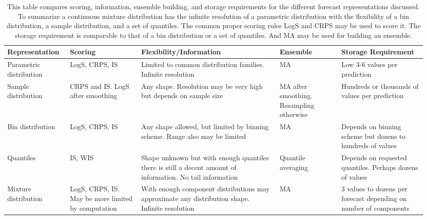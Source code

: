 \documentclass[11pt,notitlepage]{isuthesis}
\begin{document}
\begin{flushleft}

  \begin{table}
   \begin{adjustwidth}{-1cm}{-1cm}
    \begin{tabular}{ | p{2.9cm} || p{3cm} | p{4cm} | p{3cm} | p{3.5cm} |}
    \hline
    \textbf{Representation} & \textbf{Scoring} & 
    \textbf{Flexibility/Information} & \textbf{Ensemble} &
    \textbf{Storage Requirement}
    \\ \hline \hline

    Parametric distribution & LogS, CRPS, IS & Limited to common 
    distribution families. 
    Infinite resolution
    & MA & Low 3-6 values per prediction \\ \hline
    
    Sample distribution & CRPS and IS. LogS after smoothing & Any shape. 
    Resolution may be
    very high but depends on sample size & MA after smoothing. Resampling 
    otherwise & 
    Hundreds or thousands of values per prediction
    \\ \hline
    
    Bin distribution & LogS, CRPS, IS &
    Any shape allowed, but limited by binning scheme. Range also may be limited
    & MA &
    Depends on binning scheme but dozens to hundreds of values
    \\ \hline


    Quantiles & IS, WIS & Shape unknown but with enough quantiles there is still
    a decent amount of information. No tail information & 
    Quantile averaging & Depends on 
    requested quantiles. Perhaps dozens of values
    \\ \hline
    
    Mixture distribution & LogS, CRPS, IS. May be more limited by computation & 
    With
    enough component distributions may
    approximate any distribution shape. Infinite resolution& MA 
    & 3 values to dozens per forecast depending on number of components
    \\ \hline
    
  
   
	 \end{tabular}
	 \end{adjustwidth}
	  \begin{center}
    \begin{minipage}{14cm}
    \captionsetup{font=scriptsize}
   \caption[Forecast representation comparison]{This table compares scoring,
   information, ensemble building, and storage requirements for the different
   forecast representations discussed. To summarize 
   a continuous mixture distribution has the 
infinite resolution of a parametric distribution with the flexibility of a bin
distribution, a sample distribution, and a set of quantiles. The common proper
scoring rules LogS and CRPS may be used to score it. The storage requirement is
comparable to that of a bin distribution or a set of quantiles. And MA may be 
used for building an ensemble.}
   \label{table:repscomp}
   \end{minipage}
   \end{center}
   \end{table}
	 

\end{flushleft}
\end{document}
